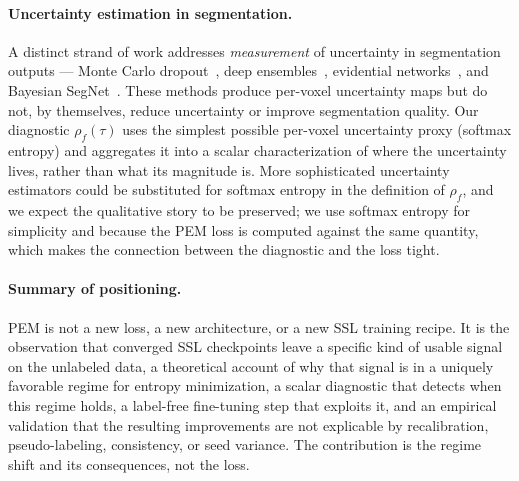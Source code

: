 \paragraph{Uncertainty estimation in segmentation.}
A distinct strand of work addresses \emph{measurement} of uncertainty in segmentation outputs --- Monte Carlo dropout~\cite{gal2016dropout}, deep ensembles~\cite{lakshminarayanan2017simple}, evidential networks~\cite{sensoy2018evidential}, and Bayesian SegNet~\cite{kendall2015bayesian}. These methods produce per-voxel uncertainty maps but do not, by themselves, reduce uncertainty or improve segmentation quality. Our diagnostic $\rho_f(\tau)$ uses the simplest possible per-voxel uncertainty proxy (softmax entropy) and aggregates it into a scalar characterization of where the uncertainty lives, rather than what its magnitude is. More sophisticated uncertainty estimators could be substituted for softmax entropy in the definition of $\rho_f$, and we expect the qualitative story to be preserved; we use softmax entropy for simplicity and because the PEM loss is computed against the same quantity, which makes the connection between the diagnostic and the loss tight.

\paragraph{Summary of positioning.}
PEM is not a new loss, a new architecture, or a new SSL training recipe. It is the observation that converged SSL checkpoints leave a specific kind of usable signal on the unlabeled data, a theoretical account of why that signal is in a uniquely favorable regime for entropy minimization, a scalar diagnostic that detects when this regime holds, a label-free fine-tuning step that exploits it, and an empirical validation that the resulting improvements are not explicable by recalibration, pseudo-labeling, consistency, or seed variance. The contribution is the regime shift and its consequences, not the loss.
